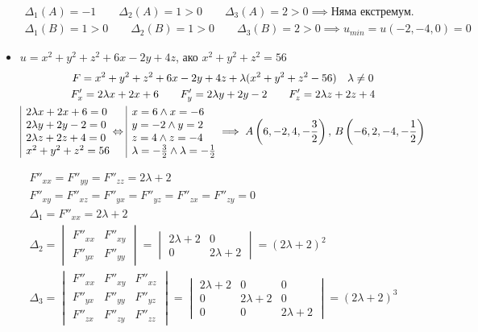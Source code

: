 \documentclass[a4paper,fleqn,12pt]{article}
\theoremstyle{definition}
\begin{document}
\begin{itemize}
\begin{gather*}
\Delta_1(A) = -1 \qquad \Delta_2(A) = 1>0 \qquad \Delta_3(A) = 2>0 \implies \text{Няма екстремум.}\\
\Delta_1(B) = 1>0 \qquad \Delta_2(B) = 1>0 \qquad \Delta_3(B) = 2>0 \implies u_{min} = u(-2,-4,0) = 0
\end{gather*}

\item $u = x^2 + y^2+ z^2 +6x - 2y + 4z $, ако $x^2 + y^2+ z^2 = 56$ 
\begin{gather*}
F = x^2 + y^2+ z^2 +6x - 2y + 4z + \lambda(x^2 + y^2+ z^2 - 56) \quad \lambda \neq 0\\
F'_x = 2\lambda x + 2x + 6 \qquad F'_y = 2\lambda y + 2y - 2 \qquad F'_z =  2\lambda z + 2z + 4 \\
\begin{array}{|l@{}}
2\lambda x + 2x + 6 = 0 \\
2\lambda y + 2y - 2 = 0 \\
2\lambda z + 2z + 4 = 0\\
x^2 + y^2+ z^2 = 56
\end{array}\Leftrightarrow 
\begin{array}{|l@{}}
x = 6 \land x = -6 \\
y = -2 \land y = 2 \\
z =4 \land z = -4 \\
\lambda = -\frac{3}{2} \land \lambda = -\frac{1}{2} 
\end{array} \implies A \left(6,-2,4, -\frac{3}{2} \right), \, B \left(-6,2,-4, -\frac{1}{2} \right) 
\end{gather*}

\begin{gather*}
F''_{xx} = F''_{yy} = F''_{zz} = 2\lambda + 2 \\
F''_{xy} = F''_{xz} = F''_{yx} = F''_{yz} = F''_{zx} = F''_{zy} = 0 \\
\Delta_1 = F''_{xx} = 2\lambda + 2 \\
 \Delta_2 = \begin{vmatrix} F''_{xx} & F''_{xy} \\ F''_{yx} & F''_{yy} \end{vmatrix} = \begin{vmatrix} 2\lambda + 2 & 0 \\0 & 2\lambda + 2  \end{vmatrix} = (2\lambda + 2)^2\\
\Delta_3 = \begin{vmatrix} F''_{xx} & F''_{xy} & F''_{xz}\\ F''_{yx} & F''_{yy} & F''_{yz} \\ F''_{zx} & F''_{zy} & F''_{zz}\end{vmatrix} = \begin{vmatrix} 2\lambda + 2 & 0 & 0 \\ 0 & 2\lambda + 2 & 0 \\ 0 & 0 & 2\lambda + 2 \end{vmatrix} = (2\lambda + 2)^3
\end{gather*}


\end{itemize}
\end{document}
